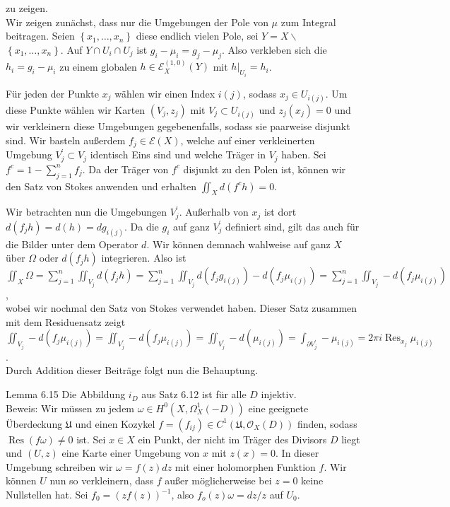 \documentclass[10pt, letterpaper]{article}
\begin{document}
zu zeigen.\\
Wir zeigen zunächst, dass nur die Umgebungen der Pole von $\mu$ zum Integral beitragen. Seien $\left\{x_{1}, \ldots, x_{n}\right\}$ diese endlich vielen Pole, sei $Y=X \backslash$\\
$\left\{x_{1}, \ldots, x_{n}\right\}$. Auf $Y \cap U_{i} \cap U_{j}$ ist $g_{i}-\mu_{i}=g_{j}-\mu_{j}$. Also verkleben sich die $h_{i}=g_{i}-\mu_{i}$ zu einem globalen $h \in \mathcal{E}_{X}^{(1,0)}(Y)$ mit $\left.h\right|_{U_{i}}=h_{i}$.

Für jeden der Punkte $x_{j}$ wählen wir einen Index $i(j)$, sodass $x_{j} \in U_{i(j)}$. Um diese Punkte wählen wir Karten $\left(V_{j}, z_{j}\right)$ mit $V_{j} \subset U_{i(j)}$ und $z_{j}\left(x_{j}\right)=0$ und wir verkleinern diese Umgebungen gegebenenfalls, sodass sie paarweise disjunkt sind. Wir basteln außerdem $f_{j} \in \mathcal{E}(X)$, welche auf einer verkleinerten Umgebung $V_{j}^{\prime} \subset V_{j}$ identisch Eins sind und welche Träger in $V_{j}$ haben. Sei $f^{c}=1-\sum_{j=1}^{n} f_{j}$. Da der Träger von $f^{c}$ disjunkt zu den Polen ist, können wir den Satz von Stokes anwenden und erhalten $\iint_{X} d\left(f^{c} h\right)=0$.

Wir betrachten nun die Umgebungen $V_{j}^{\prime}$. Außerhalb von $x_{j}$ ist dort $d\left(f_{j} h\right)= d(h)=d g_{i(j)}$. Da die $g_{i}$ auf ganz $V_{j}^{\prime}$ definiert sind, gilt das auch für die Bilder unter dem Operator $d$. Wir können demnach wahlweise auf ganz $X$ über $\Omega$ oder $d\left(f_{j} h\right)$ integrieren. Also ist\\
$\iint_{X} \Omega=\sum_{j=1}^{n} \iint_{V_{j}} d\left(f_{j} h\right)=\sum_{j=1}^{n} \iint_{V_{j}} d\left(f_{j} g_{i(j)}\right)-d\left(f_{j} \mu_{i(j)}\right)=\sum_{j=1}^{n} \iint_{V_{j}}-d\left(f_{j} \mu_{i(j)}\right)$,\\
wobei wir nochmal den Satz von Stokes verwendet haben. Dieser Satz zusammen mit dem Residuensatz zeigt\\
$\iint_{V_{j}}-d\left(f_{j} \mu_{i(j)}\right)=\iint_{V_{j}^{\prime}}-d\left(f_{j} \mu_{i(j)}\right)=\iint_{V_{j}^{\prime}}-d\left(\mu_{i(j)}\right)=\int_{\partial V_{j}^{\prime}}-\mu_{i(j)}=2 \pi i \operatorname{Res}_{x_{j}} \mu_{i(j)}$.\\
Durch Addition dieser Beiträge folgt nun die Behauptung.

Lemma 6.15 Die Abbildung $i_{D}$ aus Satz 6.12 ist für alle $D$ injektiv.\\
Beweis: Wir müssen zu jedem $\omega \in H^{0}\left(X, \Omega_{X}^{1}(-D)\right)$ eine geeignete Überdeckung $\mathfrak{U}$ und einen Kozykel $f=\left(f_{i j}\right) \in C^{1}\left(\mathfrak{U}, \mathcal{O}_{X}(D)\right)$ finden, sodass $\operatorname{Res}(f \omega) \neq 0$ ist. Sei $x \in X$ ein Punkt, der nicht im Träger des Divisors $D$ liegt und $(U, z)$ eine Karte einer Umgebung von $x$ mit $z(x)=0$. In dieser Umgebung schreiben wir $\omega=f(z) d z$ mit einer holomorphen Funktion $f$. Wir können $U$ nun so verkleinern, dass $f$ außer möglicherweise bei $z=0$ keine Nullstellen hat. Sei $f_{0}=(z f(z))^{-1}$, also $f_{o}(z) \omega=d z / z$ auf $U_{0}$.
\end{document}
